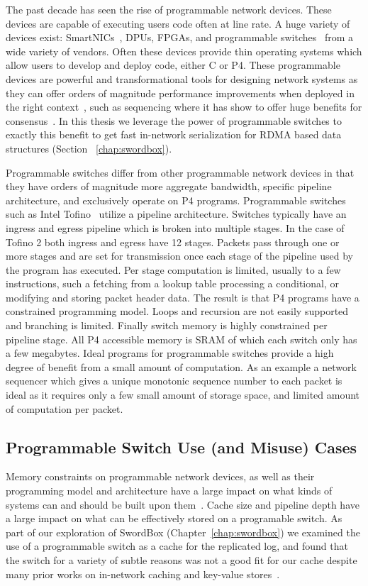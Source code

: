 \documentclass[12pt]{ucsddissertation}
\newcommand{\sword}{SwordBox}
\begin{document}
The past decade has seen the rise of programmable network devices. These devices are capable of
executing users code often at line rate. A huge variety of devices exist: SmartNICs~\cite{fairnic},
DPUs, FPGAs, and programmable switches~\cite{p4} from a wide variety of vendors. Often these devices
provide thin operating systems which allow users to develop and deploy code, either C or P4. These
programmable devices are powerful and transformational tools for designing network systems as they
can offer orders of magnitude performance improvements when deployed in the right
context~\cite{when-computer}, such as sequencing where it has show to offer huge benefits for
consensus~\cite{eris, nopaxos}. In this thesis we leverage the power of programmable switches to
exactly this benefit to get fast in-network serialization for RDMA based data structures (Section
~\ref{chap:swordbox}).

Programmable switches differ from other programmable network devices in that they have orders of
magnitude more aggregate bandwidth, specific pipeline architecture, and exclusively operate on P4
programs.
Programmable switches such as Intel Tofino~\cite{tofino2} utilize a pipeline architecture. Switches
typically have an ingress and egress pipeline which is broken into multiple stages. In the case of
Tofino 2 both ingress and egress have 12 stages. Packets pass through one or more stages and are set
for transmission once each stage of the pipeline used by the program has executed. Per stage
computation is limited, usually to a few instructions, such a fetching from a lookup table
processing a conditional, or modifying and storing packet header data. The result is that P4
programs have a constrained programming model. Loops and recursion are not easily supported and
branching is limited. Finally switch memory is highly constrained per pipeline stage. All P4
accessible memory is SRAM of which each switch only has a few megabytes.
Ideal programs for programmable switches provide a high degree of benefit from a small amount of
computation. As an example a network sequencer which gives a unique monotonic sequence number to
each packet is ideal as it requires only a few small amount of storage space, and limited amount of
computation per packet.

\subsection{Programmable Switch Use (and Misuse) Cases}

Memory constraints on programmable network devices, as well as their programming model and
architecture have a large impact on what kinds of systems can and should be built upon
them~\cite{when-computer}. Cache size and pipeline depth have a large impact on what can be
effectively stored on a programable switch. As part of our exploration of {\sword}
(Chapter~\ref{chap:swordbox}) we examined the use of a programmable switch as a cache for the
replicated log, and found that the switch for a variety of subtle reasons was not a good fit for our
cache despite many prior works on in-network caching and key-value
stores~\cite{netcache,netchain,netkv,netlock}.
\end{document}
